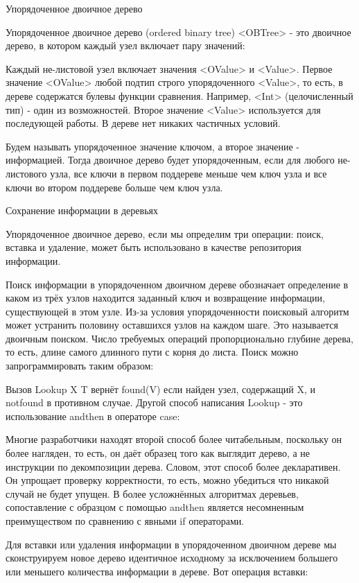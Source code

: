 Упорядоченное двоичное дерево

Упорядоченное двоичное дерево (ordered binary tree) <OBTree> - это двоичное дерево, в котором каждый узел включает пару значений:

Каждый не-листовой узел включает значения <OValue> и <Value>. Первое значение <OValue> любой подтип строго упорядоченного <Value>, то есть, в дереве содержатся булевы функции сравнения. Например, <Int> (целочисленный тип) - один из возможностей. Второе значение <Value> используется для последующей работы. В дереве нет никаких частичных условий.

Будем называть упорядоченное значение ключом, а второе значение - информацией. Тогда двоичное дерево будет упорядоченным, если для любого не-листового узла, все ключи в первом поддереве меньше чем ключ узла и все ключи во втором поддереве больше чем ключ узла.

Сохранение информации в деревьях

Упорядоченное двоичное дерево, если мы определим три операции: поиск, вставка и удаление, может быть использовано в качестве репозитория информации.

Поиск информации в упорядоченном двоичном дереве обозначает определение в каком из трёх узлов находится заданный ключ и возвращение информации, существующей в этом узле. Из-за условия упорядоченности поисковый алгоритм может устранить половину оставшихся узлов на каждом шаге. Это называется двоичным поиском. Число требуемых операций пропорционально глубине дерева, то есть, длине самого длинного пути с корня до листа. Поиск можно запрограммировать таким образом:

Вызов {Lookup X T} вернёт found(V) если найден узел, содержащий X, и notfound в противном случае. Другой способ написания Lookup - это использование andthen в операторе case:

Многие разработчики находят второй способ более читабельным, поскольку он более нагляден, то есть, он даёт образец того как выглядит дерево, а не инструкции по декомпозиции дерева. Словом, этот способ более декларативен. Он упрощает проверку корректности, то есть, можно убедиться что никакой случай не будет упущен. В более усложнённых алгоритмах деревьев, сопоставление с образцом с помощью andthen является несомненным преимуществом по сравнению с явными if операторами.

Для вставки или удаления информации в упорядоченном двоичном дереве мы сконструируем новое дерево идентичное исходному за исключением большего или меньшего количества информации в дереве. Вот операция вставки:

